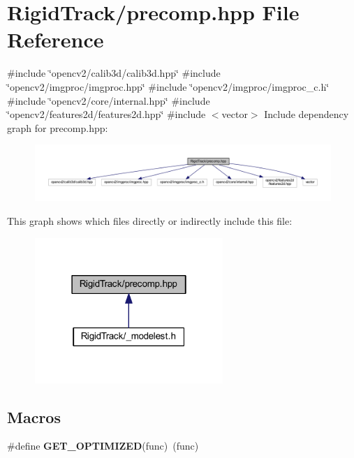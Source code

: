 \section{Rigid\+Track/precomp.hpp File Reference}
\label{precomp_8hpp}
{\ttfamily \#include \char`\"{}opencv2/calib3d/calib3d.\+hpp\char`\"{}}\newline
{\ttfamily \#include \char`\"{}opencv2/imgproc/imgproc.\+hpp\char`\"{}}\newline
{\ttfamily \#include \char`\"{}opencv2/imgproc/imgproc\+\_\+c.\+h\char`\"{}}\newline
{\ttfamily \#include \char`\"{}opencv2/core/internal.\+hpp\char`\"{}}\newline
{\ttfamily \#include \char`\"{}opencv2/features2d/features2d.\+hpp\char`\"{}}\newline
{\ttfamily \#include $<$vector$>$}\newline
Include dependency graph for precomp.\+hpp\+:\nopagebreak
\begin{figure}[H]
\begin{center}
\leavevmode
\includegraphics[width=350pt]{precomp_8hpp__incl}
\end{center}
\end{figure}
This graph shows which files directly or indirectly include this file\+:\nopagebreak
\begin{figure}[H]
\begin{center}
\leavevmode
\includegraphics[width=202pt]{precomp_8hpp__dep__incl}
\end{center}
\end{figure}
\subsection*{Macros}
\begin{DoxyCompactItemize}
\item 
\#define \textbf{ G\+E\+T\+\_\+\+O\+P\+T\+I\+M\+I\+Z\+ED}(func)~(func)
\end{DoxyCompactItemize}


